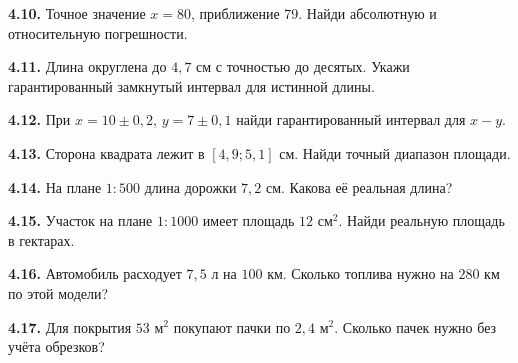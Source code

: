 \noindent\begin{minipage}[t]{\linewidth}\textbf{4.10.} Точное значение \(x=80\), приближение \(79\). Найди абсолютную и относительную погрешности.\par\end{minipage}\par
\noindent\begin{minipage}[t]{\linewidth}\textbf{4.11.} Длина округлена до \(4{,}7\) см с точностью до десятых. Укажи гарантированный замкнутый интервал для истинной длины.\par\end{minipage}\par
\noindent\begin{minipage}[t]{\linewidth}\textbf{4.12.} При \(x=10\pm0{,}2\), \(y=7\pm0{,}1\) найди гарантированный интервал для \(x-y\).\par\end{minipage}\par
\noindent\begin{minipage}[t]{\linewidth}\textbf{4.13.} Сторона квадрата лежит в \([4{,}9;5{,}1]\) см. Найди точный диапазон площади.\par\end{minipage}\par
\noindent\begin{minipage}[t]{\linewidth}\textbf{4.14.} На плане \(1:500\) длина дорожки \(7{,}2\) см. Какова её реальная длина?\par\end{minipage}\par
\noindent\begin{minipage}[t]{\linewidth}\textbf{4.15.} Участок на плане \(1:1000\) имеет площадь \(12\text{ см}^2\). Найди реальную площадь в гектарах.\par\end{minipage}\par
\noindent\begin{minipage}[t]{\linewidth}\textbf{4.16.} Автомобиль расходует \(7{,}5\) л на \(100\) км. Сколько топлива нужно на \(280\) км по этой модели?\par\end{minipage}\par
\noindent\begin{minipage}[t]{\linewidth}\textbf{4.17.} Для покрытия \(53\text{ м}^2\) покупают пачки по \(2{,}4\text{ м}^2\). Сколько пачек нужно без учёта обрезков?\par\end{minipage}\par
